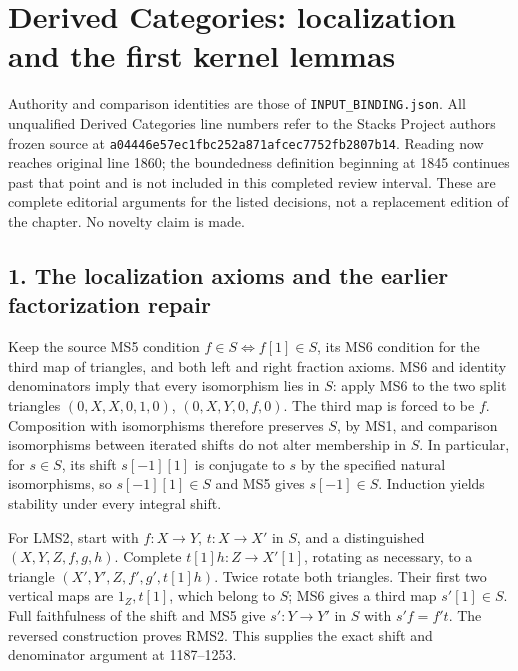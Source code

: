 \section{\texorpdfstring{Derived Categories:\allowbreak{} localization and the first kernel lemmas}{Derived  localization and the first kernel lemmas}}\label{proofs-1149-1843-derived-categories-localization-and-the-first-kernel-lemmas}

Authority and comparison identities are those of \texttt{INPUT\_\allowbreak{}BINDING.\allowbreak{}json}. All unqualified Derived Categories line numbers refer to the Stacks Project authors\textquotesingle{} frozen source at \texttt{a04446e5\allowbreak{}7ec1fbc2\allowbreak{}52a871af\allowbreak{}cec7752f\allowbreak{}b2807b14}. Reading now reaches original line 1860; the boundedness definition beginning at 1845 continues past that point and is not included in this completed review interval. These are complete editorial arguments for the listed decisions,\allowbreak{} not a replacement edition of the chapter. No novelty claim is made.

\subsection{1. The localization axioms and the earlier factorization repair}\label{proofs-1149-1843-the-localization-axioms-and-the-earlier-factorization-repair}

Keep the source MS5 condition \(f\in S\iff f[1]\in S\),\allowbreak{} its MS6 condition for the third map of triangles,\allowbreak{} and both left and right fraction axioms. MS6 and identity denominators imply that every isomorphism lies in \(S\):\allowbreak{} apply MS6 to the two split triangles \((0,X,X,0,1,0)\),\allowbreak{} \((0,X,Y,0,f,0)\). The third map is forced to be \(f\). Composition with isomorphisms therefore preserves \(S\),\allowbreak{} by MS1,\allowbreak{} and comparison isomorphisms between iterated shifts do not alter membership in \(S\). In particular,\allowbreak{} for \(s\in S\),\allowbreak{} its shift \(s[-1][1]\) is conjugate to \(s\) by the specified natural isomorphisms,\allowbreak{} so \(s[-1][1]\in S\) and MS5 gives \(s[-1]\in S\). Induction yields stability under every integral shift.

For LMS2,\allowbreak{} start with \(f:X\to Y\),\allowbreak{} \(t:X\to X'\) in \(S\),\allowbreak{} and a distinguished \((X,Y,Z,f,g,h)\). Complete \(t[1]h:Z\to X'[1]\),\allowbreak{} rotating as necessary,\allowbreak{} to a triangle \((X',Y',Z,f',g',t[1]h)\). Twice rotate both triangles. Their first two vertical maps are \(1_Z,t[1]\),\allowbreak{} which belong to \(S\); MS6 gives a third map \(s'[1]\in S\). Full faithfulness of the shift and MS5 give \(s':Y\to Y'\) in \(S\) with \(s'f=f't\). The reversed construction proves RMS2. This supplies the exact shift and denominator argument at 1187–\allowbreak{}1253.

